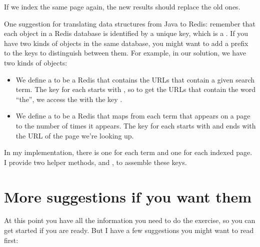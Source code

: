 \documentclass[12pt]{book}
\theoremstyle{exercise}
\begin{document}

If we index the same page again, the new results should replace the old
ones.

One suggestion for translating data structures from Java to Redis:
remember that each object in a Redis database is identified by a unique
key, which is a . If you have two kinds of objects in the same
database, you might want to add a prefix to the keys to distinguish
between them. For example, in our solution, we have two kinds of
objects:

\begin{itemize}

\item
  We define a  to be a Redis  that contains
  the URLs that contain a given search term. The key for each
   starts with , so to get the URLs
  that contain the word ``the'', we access the  with the key
  .

\item
  We define a  to be a Redis  that maps
  from each term that appears on a page to the number of times it
  appears. The key for each  starts with
   and ends with the URL of the page we're
  looking up.

\end{itemize}


In my implementation,  there is one  for each term and one
 for each indexed page. I provide two helper
methods,  and , to assemble
these keys.



\section{More suggestions if you want them}
\label{more-suggestions-if-you-want-them}

At this point you have all the information you need to do the exercise, so
you can get started if you are ready. But I have a few suggestions you
might want to read first:
\end{document}
